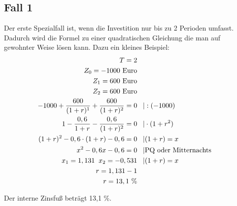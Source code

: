 \subsection{Fall 1}
Der erste Spezialfall ist, wenn die Investition nur bis zu 2 Perioden umfasst. Dadurch wird die Formel zu einer quadratischen Gleichung die man auf gewohnter Weise lösen kann. Dazu ein kleines Beispiel:
\begin{align*}
    T = 2                                                                                                 \\
    Z_0 =-1000 \text{ Euro}                                                                               \\
    Z_1 = 600 \text{ Euro}                                                                                \\
    Z_2 = 600 \text{ Euro}                                                                                \\
    -1000 + \frac{600}{(1+r)^1} + \frac{600}{(1+r)^2} = 0 & \text{\phantom m}|:(-1000)                    \\
    1 - \frac{0,6}{1+r} - \frac{0,6}{(1+r)^2} = 0         & \text{\phantom m}|\cdot(1+r^2)                \\
    (1+r)^2 - 0,6\cdot(1+r) - 0,6 = 0                     & \text{\phantom m}|(1+r) = x                   \\
    x^2-0,6x-0,6=0                                        & \text{\phantom m}|\text{PQ oder Mitternachts} \\
    x_1 = 1,131 \text{\phantom p} x_2 = -0,531            & \text{\phantom m}|(1+r) = x                   \\
    r = 1,131 - 1                                                                                         \\
    r = 13,1 \text{ \%}
\end{align*}
\begin{center}
    Der interne Zinsfuß beträgt 13,1 \%.
\end{center}
\newpage
